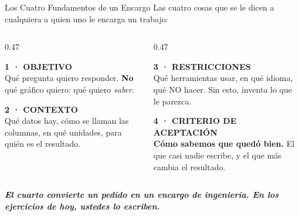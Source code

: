 \documentclass[aspectratio=169, 11pt]{beamer}
\begin{document}
\begin{frame}[shrink=5]{Los Cuatro Fundamentos de un Encargo}
  \vspace{-2pt}
  {\scriptsize\color{textMuted}
   Las cuatro cosas que se le dicen a cualquiera a quien uno le encarga un
   trabajo:}
  \vspace{2pt}
  \begin{columns}[T]
    \begin{column}{0.47\textwidth}
      \begin{tcolorbox}[colback=arcaGray, colframe=arcaDark, boxrule=0pt,
        leftrule=3pt, arc=3pt, left=8pt, right=8pt, top=4pt, bottom=4pt]
        {\scriptsize\color{arcaDark}\bfseries 1 · OBJETIVO}\\[3pt]
        {\scriptsize\color{textMuted}
         Qué pregunta quiero responder. \textbf{No} qué gráfico quiero: qué
         quiero \emph{saber}.}
      \end{tcolorbox}
      \vspace{3pt}
      \begin{tcolorbox}[colback=arcaGray, colframe=arcaDark, boxrule=0pt,
        leftrule=3pt, arc=3pt, left=8pt, right=8pt, top=4pt, bottom=4pt]
        {\scriptsize\color{arcaDark}\bfseries 2 · CONTEXTO}\\[3pt]
        {\scriptsize\color{textMuted}
         Qué datos hay, cómo se llaman las columnas, en qué unidades, para
         quién es el resultado.}
      \end{tcolorbox}
    \end{column}
    \begin{column}{0.47\textwidth}
      \begin{tcolorbox}[colback=arcaGray, colframe=arcaDark, boxrule=0pt,
        leftrule=3pt, arc=3pt, left=8pt, right=8pt, top=4pt, bottom=4pt]
        {\scriptsize\color{arcaDark}\bfseries 3 · RESTRICCIONES}\\[3pt]
        {\scriptsize\color{textMuted}
         Qué herramientas usar, en qué idioma, qué NO hacer. Sin esto,
         inventa lo que le parezca.}
      \end{tcolorbox}
      \vspace{3pt}
      \begin{tcolorbox}[colback=arcaGray, colframe=codeGreen, boxrule=0pt,
        leftrule=3pt, arc=3pt, left=8pt, right=8pt, top=4pt, bottom=4pt]
        {\scriptsize\color{codeGreen}\bfseries 4 · CRITERIO DE ACEPTACIÓN}\\[3pt]
        {\scriptsize\color{textMuted}
         \textbf{Cómo sabemos que quedó bien.} El que casi nadie escribe, y
         el que más cambia el resultado.}
      \end{tcolorbox}
    \end{column}
  \end{columns}
  \vspace{3pt}
  {\scriptsize\color{arcaDark}\bfseries\itshape
   El cuarto convierte un pedido en un encargo de ingeniería. En los
   ejercicios de hoy, ustedes lo escriben.}
\end{frame}
\end{document}
